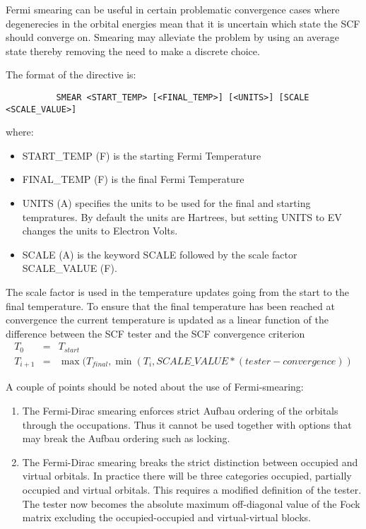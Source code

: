 \documentclass[11pt,fleqn]{article}
\begin{document}
Fermi smearing can be useful in certain problematic convergence cases
where degenerecies in the orbital energies mean that it is uncertain
which state the SCF should converge on. Smearing may alleviate the
problem by using an average state thereby removing the need to make
a discrete choice.

The format of the directive is:

{
\footnotesize
\begin{verbatim}
          SMEAR <START_TEMP> [<FINAL_TEMP>] [<UNITS>] [SCALE <SCALE_VALUE>]
\end{verbatim}
}

where:

\begin{itemize}
\item START\_TEMP (F) is the starting Fermi Temperature
\item FINAL\_TEMP (F) is the final Fermi Temperature
\item UNITS (A) specifies the units to be used for the final and
  starting tempratures. By default the units are Hartrees, but setting
  UNITS to EV changes the units to Electron Volts.
\item SCALE (A) is the keyword SCALE followed by the scale factor 
  SCALE\_VALUE (F). 
\end{itemize}
The scale factor is used in the temperature updates
going from the start to the final temperature. To ensure that the final
temperature has been reached at convergence the current temperature
is updated as a linear function of the difference between the SCF tester and
the SCF convergence criterion
\begin{eqnarray}
   T_0     &=& T_{start} \\
   T_{i+1} &=& \max(T_{final},\min(T_i, SCALE\_VALUE * (tester-convergence))
\end{eqnarray}

A couple of points should be noted about the use of Fermi-smearing:

\begin{enumerate}
\item The Fermi-Dirac smearing enforces strict Aufbau ordering of the
  orbitals through the occupations. Thus it cannot be used together
  with options that may break the Aufbau ordering such as locking.
\item The Fermi-Dirac smearing breaks the strict distinction between
  occupied and virtual orbitals. In practice there will be three categories
  occupied, partially occupied and virtual orbitals. This requires a 
  modified definition of the tester. The tester now becomes the absolute
  maximum off-diagonal value of the Fock matrix excluding the 
  occupied-occupied and virtual-virtual blocks.
\end{enumerate}
\end{document}
